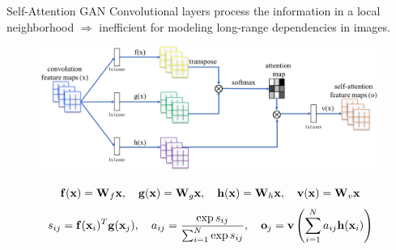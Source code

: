 \begin{frame}{Self-Attention GAN}
	Convolutional layers process the information in a local neighborhood $\Rightarrow$ inefficient for modeling long-range dependencies in images.
	\vspace{-0.3cm}
	\begin{figure}
		\centering
		\includegraphics[width=0.9\linewidth]{figs/self-attention}
	\end{figure}
	\[
		\mathbf{f}(\mathbf{x}) = \mathbf{W}_f \mathbf{x}, \quad \mathbf{g}(\mathbf{x}) = \mathbf{W}_g\mathbf{x}, \quad \mathbf{h} (\mathbf{x}) = \mathbf{W}_h\mathbf{x}, \quad \mathbf{v}(\mathbf{x}) = \mathbf{W}_v\mathbf{x}
	\]
	\[
		s_{ij} = \mathbf{f}(\mathbf{x}_i)^T \mathbf{g}(\mathbf{x}_j), \quad a_{ij} = \frac{\exp{s_{ij}}}{\sum_{i=1}^N \exp{s_{ij}}}, \quad \textbf{o}_j = \textbf{v}\left( \sum_{i=1}^N a_{ij} \mathbf{h}(\mathbf{x}_i) \right)
	\]
\end{frame}
